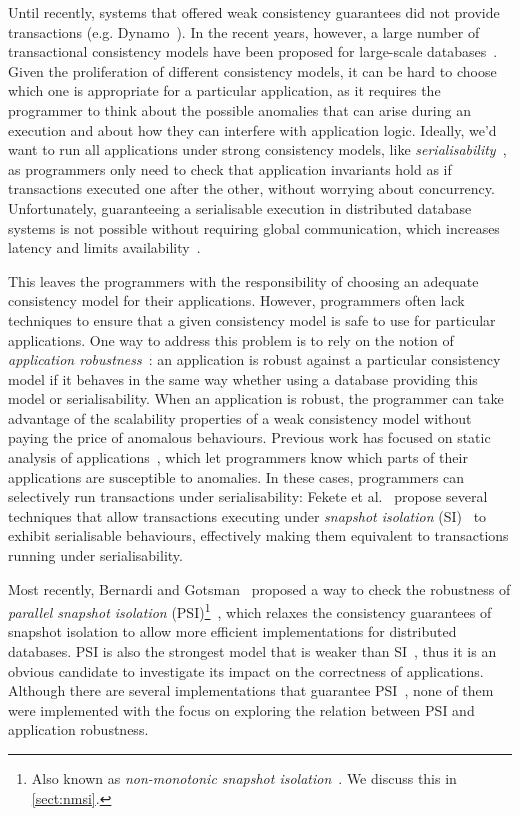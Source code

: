 Until recently, systems that offered weak consistency guarantees did not provide transactions (e.g. Dynamo~\citep{dynamo-amz}). In the recent years, however, a large number of transactional consistency models have been proposed for large-scale databases~\citep{psi-intro, ardekani_nmsi, lloyd_cops, bailis_ramp}. Given the proliferation of different consistency models, it can be hard to choose which one is appropriate for a particular application, as it requires the programmer to think about the possible anomalies that can arise during an execution and about how they can interfere with application logic. Ideally, we'd want to run all applications under strong consistency models, like \emph{serialisability}~\citep{bernstein_concurrency}, as programmers only need to check that application invariants hold as if transactions executed one after the other, without worrying about concurrency. Unfortunately, guaranteeing a serialisable execution in distributed database systems is not possible without requiring global communication, which increases latency and limits availability~\citep{cap-theorem}.

This leaves the programmers with the responsibility of choosing an adequate consistency model for their applications. However, programmers often lack techniques to ensure that a given consistency model is safe to use for particular applications. One way to address this problem is to rely on the notion of \emph{application robustness}~\citep{fekete_ssi, concur_robustness}: an application is robust against a particular consistency model if it behaves in the same way whether using a database providing this model or serialisability. When an application is robust, the programmer can take advantage of the scalability properties of a weak consistency model without paying the price of anomalous behaviours. Previous work has focused on static analysis of applications~\citep{sudhir_static, cise_tool}, which let programmers know which parts of their applications are susceptible to anomalies. In these cases, programmers can selectively run transactions under serialisability: Fekete et al.~\citep{fekete_ssi, fekete_isolation_levels} propose several techniques that allow transactions executing under \emph{snapshot isolation} (SI)~\citep{sql-critique} to exhibit serialisable behaviours, effectively making them equivalent to transactions running under serialisability.

Most recently, Bernardi and Gotsman~\citep{concur_robustness} proposed a way to check the robustness of \emph{parallel snapshot isolation} (PSI)\footnote{Also known as \emph{non-monotonic snapshot isolation}~\citep{ardekani_nmsi}. We discuss this in \textsection\ref{sect:nmsi}.}~\citep{psi-intro}, which relaxes the consistency guarantees of snapshot isolation to allow more efficient implementations for distributed databases. PSI is also the strongest model that is weaker than SI~\citep{concur_framework}, thus it is an obvious candidate to investigate its impact on the correctness of applications. Although there are several implementations that guarantee PSI~\citep{psi-intro, ardekani_nmsi, moniz_blotter}, none of them were implemented with the focus on exploring the relation between PSI and application robustness.

